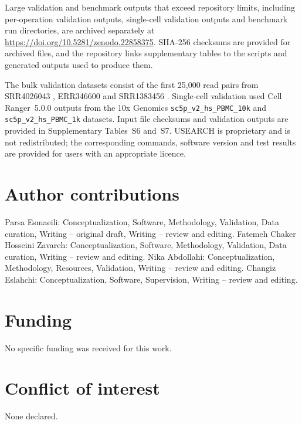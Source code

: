 \documentclass[unnumsec,webpdf,contemporary,large]{oup-authoring-template}
\begin{document}
Large validation and benchmark outputs that exceed repository limits, including
per-operation validation outputs, single-cell validation outputs and benchmark
run directories, are archived separately at
\url{https://doi.org/10.5281/zenodo.22858375}. SHA-256 checksums are provided
for archived files, and the repository links supplementary tables to the
scripts and generated outputs used to produce them.

The bulk validation datasets consist of the first 25,000 read pairs from
SRR4026043 \citep{vanderheiden2017}, ERR346600 \citep{greiff2014} and
SRR1383456 \citep{stern2014}. Single-cell validation used Cell Ranger~5.0.0
outputs from the 10x Genomics \texttt{sc5p\_v2\_hs\_PBMC\_10k} and
\texttt{sc5p\_v2\_hs\_PBMC\_1k} datasets. Input file checksums and validation
outputs are provided in Supplementary Tables~S6 and~S7. USEARCH is proprietary
and is not redistributed; the corresponding commands, software version and test
results are provided for users with an appropriate licence.

\section*{Author contributions}

Parsa Esmaeili: Conceptualization, Software, Methodology, Validation, Data curation, Writing -- original draft, Writing -- review and editing.
Fatemeh Chaker Hosseini Zavareh: Conceptualization, Software, Methodology, Validation, Data curation, Writing -- review and editing.
Nika Abdollahi: Conceptualization, Methodology, Resources, Validation, Writing -- review and editing.
Changiz Eslahchi: Conceptualization, Software, Supervision, Writing -- review and editing.
\section*{Funding}
No specific funding was received for this work.

\section*{Conflict of interest}
None declared.
\end{document}
